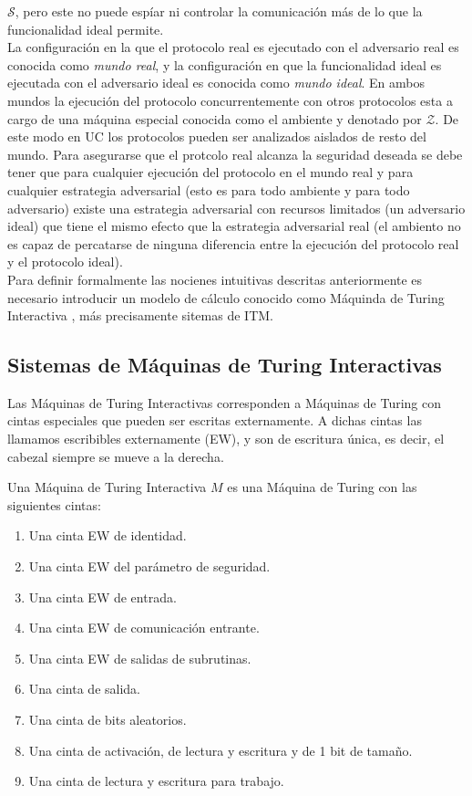$\mathcal{S}$, pero este no puede espíar ni controlar la comunicación más de lo que la funcionalidad ideal
permite.\\
La configuración en la que el protocolo real es ejecutado con el adversario real es conocida como \textit{mundo
real}, y la configuración en que la funcionalidad ideal es ejecutada con el adversario ideal es conocida como
\textit{mundo ideal}. En ambos mundos la ejecución del protocolo concurrentemente con otros protocolos esta a cargo
de una máquina especial conocida como el ambiente y denotado por $\mathcal{Z}$. De este modo en UC los protocolos
pueden ser analizados aislados de resto del mundo. Para asegurarse que el protcolo real alcanza la seguridad deseada
se debe tener que para cualquier ejecución del protocolo en el mundo real y para cualquier estrategia adversarial
(esto es para todo ambiente y para todo adversario) existe una estrategia adversarial con recursos limitados (un
adversario ideal) que tiene el mismo efecto que la estrategia adversarial real (el ambiento no es capaz de percatarse
de ninguna diferencia entre la ejecución del protocolo real y el protocolo ideal).\\
Para definir formalmente las nocienes intuitivas descritas anteriormente es necesario introducir un modelo de
cálculo conocido como Máquinda de Turing Interactiva , más precisamente sitemas de ITM.

\subsection{Sistemas de Máquinas de Turing Interactivas}

Las Máquinas de Turing Interactivas corresponden a Máquinas de Turing con cintas especiales que pueden ser
escritas externamente. A dichas cintas las llamamos escribibles externamente (EW), y son de escritura única,
es decir, el cabezal siempre se mueve a la derecha.

\begin{definicion}
Una Máquina de Turing Interactiva $M$ es una Máquina de Turing con las siguientes cintas:
\begin{enumerate}
    \item Una cinta EW de identidad.
    \item Una cinta EW del parámetro de seguridad.
    \item Una cinta EW de entrada.
    \item Una cinta EW de comunicación entrante.
    \item Una cinta EW de salidas de subrutinas.
    \item Una cinta de salida.
    \item Una cinta de bits aleatorios.
    \item Una cinta de activación, de lectura y escritura y de 1 bit de tamaño.
    \item Una cinta de lectura y escritura para trabajo. 
\end{enumerate}
\end{definicion}


